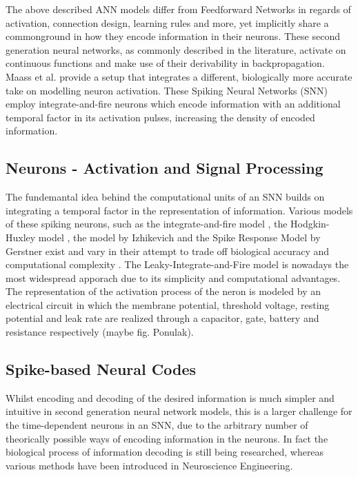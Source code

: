 \documentclass[letterpaper, 10 pt, conference]{ieeeconf}  %
\begin{document}
The above described ANN models differ from Feedforward Networks in regards of activation, connection design, learning rules and more, yet implicitly
share a commonground in how they encode information in their neurons. These second generation neural networks, as commonly described in the literature,
activate on continuous functions and make use of their derivability in backpropagation. Maass et al. \cite{maassNetworksSpikingNeurons1997} 
provide a setup that
integrates a different, biologically more accurate take on modelling neuron activation. These Spiking Neural Networks (SNN) employ
integrate-and-fire neurons \cite{maassNetworksSpikingNeurons} which encode information with an additional temporal factor in its activation pulses, increasing
the density of encoded information.  

\subsection{Neurons - Activation and Signal Processing} 

The fundemantal idea behind the computational units of an SNN builds on integrating a temporal factor 
in the representation of information. Various models of these spiking neurons, such as the integrate-and-fire model
 \cite{abbottLapicqueIntroductionIntegrateandfire1999}, 
the Hodgkin-Huxley model \cite{hodgkinQuantitativeDescriptionMembrane1952}, the model by Izhikevich \cite{izhikevichSimpleModelSpiking2003}
and the Spike Response Model by Gerstner \cite{gerstnerSpikeresponseModel2008}
exist and vary in their attempt to trade off biological accuracy and computational complexity \cite{gruningSpikingNeuralNetworks2014}.
The Leaky-Integrate-and-Fire model is nowadays the most widespread apporach due to its simplicity and computational advantages. 
The representation of the activation process of the neron is modeled by an electrical circuit in which the membrane potential, threshold voltage,
resting potential and leak rate are realized through a capacitor, gate, battery and resistance respectively
\cite{abbottLapicqueIntroductionIntegrateandfire1999}\cite{ponulakIntroductionSpikingNeural2011}(maybe fig. Ponulak).
\subsection{Spike-based Neural Codes}

Whilst encoding and decoding of the desired information is much simpler and intuitive in second generation neural network models,
this is a larger challenge for the time-dependent neurons in an SNN, due to the arbitrary 
number of theorically possible ways of encoding information in the neurons. In fact the biological process of information decoding is 
still being researched, whereas various methods have been introduced in Neuroscience Engineering.
\end{document}
